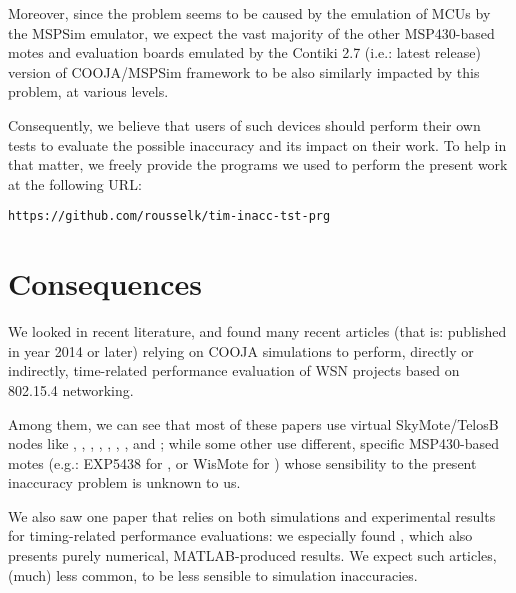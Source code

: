 \documentclass[10pt]{ewsn-proc}
\begin{document}
\medskip

Moreover, since the problem seems to be caused by the emulation of
MCUs by the MSPSim emulator, we expect the vast majority of the other
MSP430-based motes and evaluation boards emulated by the Contiki 2.7
(i.e.: latest release) version of COOJA/MSPSim framework to be also similarly
impacted by this problem, at various levels.

Consequently, we believe that users of such devices should perform their
own tests to evaluate the possible inaccuracy and its impact on their work.
To help in that matter, we freely provide the programs we used to perform the
present work at the following URL:

\smallskip

\begin{center}
\texttt{https://github.com/rousselk/tim-inacc-tst-prg}
\end{center}

\bigskip



\section{Consequences}
\label{consequences}

We looked in recent literature, and found many recent articles (that is:
published in year 2014 or later) relying on COOJA simulations to perform,
directly or indirectly, time-related performance evaluation of WSN projects
based on 802.15.4 networking.

Among them, we can see that most of these papers use virtual SkyMote/TelosB
nodes like
\cite{Constrain-Routing-Trees-2014},
\cite{Co-RPL-2014}, \cite{DINAS-2014},
\cite{Efficient-Distrib-Svc-Discovery-2014},
\cite{IETF-Routing-WSN-2014},
\cite{TinySDN-2014}, \cite{Trickle-L2-2014},
and \cite{Visual-Sensor-Networks-2014};
while some other use different, specific MSP430-based motes
(e.g.: EXP5438 for \cite{Key-Mgmt-2015}, or WisMote for
\cite{Lightweight-Multicast-Forwarding-2014}) whose sensibility
to the present inaccuracy problem is unknown to us.

We also saw one paper that relies on both simulations and experimental
results for timing-related performance evaluations: we especially found
\cite{Probing-Mech-wu-2015}, which also presents purely numerical,
MATLAB-produced results. We expect such articles, (much) less common,
to be less sensible to simulation inaccuracies.
\end{document}
